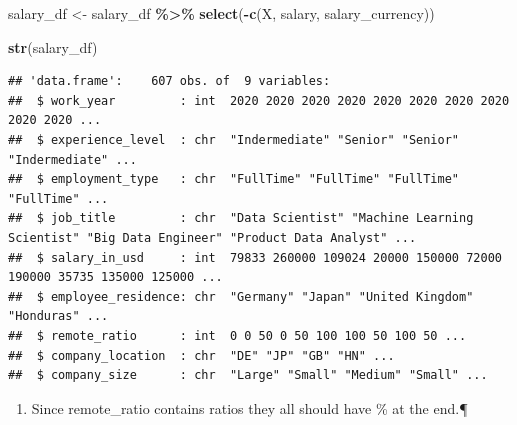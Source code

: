 \documentclass[
]{article}
\newenvironment{Shaded}{\begin{snugshade}}{\end{snugshade}}
\newcommand{\CommentTok}[1]{\textcolor[rgb]{0.56,0.35,0.01}{\textit{#1}}}
\newcommand{\FunctionTok}[1]{\textcolor[rgb]{0.13,0.29,0.53}{\textbf{#1}}}
\newcommand{\NormalTok}[1]{#1}
\newcommand{\OtherTok}[1]{\textcolor[rgb]{0.56,0.35,0.01}{#1}}
\newcommand{\SpecialCharTok}[1]{\textcolor[rgb]{0.81,0.36,0.00}{\textbf{#1}}}
\newcommand{\StringTok}[1]{\textcolor[rgb]{0.31,0.60,0.02}{#1}}
\providecommand{\tightlist}{%
  \setlength{\itemsep}{0pt}\setlength{\parskip}{0pt}}
\begin{document}
\begin{Shaded}
\begin{Highlighting}[]
\NormalTok{salary\_df }\OtherTok{\textless{}{-}}\NormalTok{ salary\_df }\SpecialCharTok{\%\textgreater{}\%}
  \FunctionTok{select}\NormalTok{(}\SpecialCharTok{{-}}\FunctionTok{c}\NormalTok{(X, salary, salary\_currency))}

\FunctionTok{str}\NormalTok{(salary\_df)}
\end{Highlighting}
\end{Shaded}

\begin{verbatim}
## 'data.frame':    607 obs. of  9 variables:
##  $ work_year         : int  2020 2020 2020 2020 2020 2020 2020 2020 2020 2020 ...
##  $ experience_level  : chr  "Indermediate" "Senior" "Senior" "Indermediate" ...
##  $ employment_type   : chr  "FullTime" "FullTime" "FullTime" "FullTime" ...
##  $ job_title         : chr  "Data Scientist" "Machine Learning Scientist" "Big Data Engineer" "Product Data Analyst" ...
##  $ salary_in_usd     : int  79833 260000 109024 20000 150000 72000 190000 35735 135000 125000 ...
##  $ employee_residence: chr  "Germany" "Japan" "United Kingdom" "Honduras" ...
##  $ remote_ratio      : int  0 0 50 0 50 100 100 50 100 50 ...
##  $ company_location  : chr  "DE" "JP" "GB" "HN" ...
##  $ company_size      : chr  "Large" "Small" "Medium" "Small" ...
\end{verbatim}

\begin{enumerate}
\def\labelenumi{\arabic{enumi}.}
\setcounter{enumi}{2}
\tightlist
\item
  Since remote\_ratio contains ratios they all should have \% at the
  end.¶
\end{enumerate}

\begin{Shaded}
\end{Shaded}

\begin{Shaded}
\end{Shaded}
\end{document}
